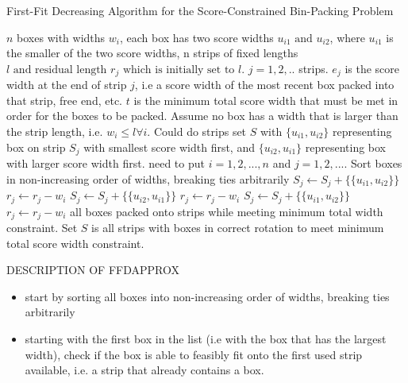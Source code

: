\documentclass[oribibl]{llncs}
\begin{document}
\begin{algorithm}[H]
	\caption{First-Fit Decreasing Algorithm for the Score-Constrained Bin-Packing Problem}
	\label{alg:ffdapprox}
	\begin{algorithmic}[1]
		\Require $n$ boxes with widths $w_i$, each box has two score widths $u_{i1} \text{ and } u_{i2}$, where $u_{i1}$ is the smaller of the two score widths, n strips of fixed lengths $l \text { and residual length } r_j \text { which is initially set to } l$. $j = 1,2, ..$ strips. $e_j$ is the score width at the end of strip $j$, i.e a score width of the most recent box packed into that strip, free end, etc. $t$ is the minimum total score width that must be met in order for the boxes to be packed. Assume no box has a width that is larger than the strip length, i.e. $w_i \leq l \forall i $. Could do strips set $S$ with $\{u_{i1}, u_{i2}\}$ representing box on strip $S_j$ with smallest score width first, and $\{u_{i2}, u_{i1}\}$ representing box with larger score width first. need to put $i = 1, 2, ..., n$ and $j = 1, 2, ...$.
		\State Sort boxes in non-increasing order of widths, breaking ties arbitrarily
						\IndIndIndStatex $S_j \gets S_j + \{\{u_{i1}, u_{i2}\}\}$
						\IndIndIndStatex $r_j \gets r_j - w_i$
						\IndIndIndStatex \Break
						\IndIndIndStatex $S_j \gets S_j + \{\{u_{i2}, u_{i1}\}\}$
						\IndIndIndStatex $r_j \gets r_j - w_i$
						\IndIndIndStatex \Break
					\EndIf
					\IndIndStatex $S_j \gets S_j + \{\{u_{i1}, u_{i2}\}\}$
					\IndIndStatex $r_j \gets r_j - w_i$
					\IndIndStatex \Break
				\EndIf
			\EndFor
		\EndFor
		\Ensure all boxes packed onto strips while meeting minimum total width constraint. Set $S$ is all strips with boxes in correct rotation to meet minimum total score width constraint.
		
	\end{algorithmic}	
\end{algorithm}

DESCRIPTION OF FFDAPPROX 
\begin{itemize}
	\item start by sorting all boxes into non-increasing order of widths, breaking ties arbitrarily
	\item starting with the first box in the list (i.e with the box that has the largest width), check if the box is able to feasibly fit onto the first used strip available, i.e. a strip that already contains a box.  
\end{itemize}
\end{document}
